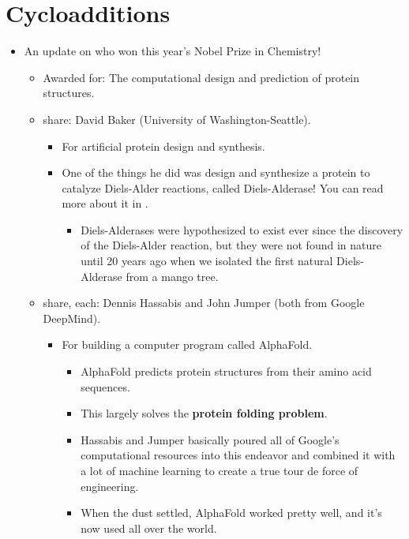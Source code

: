 \documentclass[../notes.tex]{subfiles}
\begin{document}
\section{Cycloadditions}
\begin{itemize}
    \item {}An update on who won this year's Nobel Prize in Chemistry!
    \begin{itemize}
        \item Awarded for: The computational design and prediction of protein structures.
        \item {} share: David Baker (University of Washington-Seattle).
        \begin{itemize}
            \item For artificial protein design and synthesis.
            \item One of the things he did was design and synthesize a protein to catalyze Diels-Alder reactions, called Diels-Alderase! You can read more about it in \textcite{bib:DielsAlderase}.
            \begin{itemize}
                \item Diels-Alderases were hypothesized to exist ever since the discovery of the Diels-Alder reaction, but they were not found in nature until 20 years ago when we isolated the first natural Diels-Alderase from a mango tree.
            \end{itemize}
        \end{itemize}
        \item {} share, each: Dennis Hassabis and John Jumper (both from Google DeepMind).
        \begin{itemize}
            \item For building a computer program called AlphaFold.
            \begin{itemize}
                \item AlphaFold predicts protein structures from their amino acid sequences.
                \item This largely solves the \textbf{protein folding problem}.
                \item Hassabis and Jumper basically poured all of Google's computational resources into this endeavor and combined it with a lot of machine learning to create a true tour de force of engineering.
                \item When the dust settled, AlphaFold worked pretty well, and it's now used all over the world.

\end{itemize}
\end{itemize}
\end{itemize}
\end{itemize}
\end{document}
